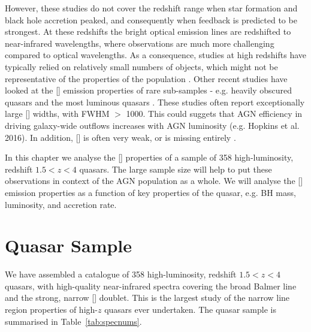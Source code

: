 However, these studies do not cover the redshift range when star formation and black hole accretion peaked, and consequently when feedback is predicted to be strongest. 
At these redshifts the bright optical emission lines are redshifted to near-infrared wavelengths, where observations are much more challenging compared to optical wavelengths. 
As a consequence, studies at high redshifts have typically relied on relatively small numbers of objects, which might not be representative of the properties of the population \citep[e.g.][]{netzer04,sulentic04,shen16a}.
Other recent studies have looked at the [] emission properties of rare sub-samples - e.g. heavily obscured quasars \citep{zakamska16} and the most luminous quasars \citep{bischetti16}. 
These studies often report exceptionally large [] widths, with FWHM $>$ 1000\kms \citep[e.g.][]{netzer04,nesvadba08,kim13,brusa15,carniani15,perna15,bischetti16}. 
This could suggets that AGN efficiency in driving galaxy-wide outflows increases with AGN luminosity (e.g. Hopkins et al. 2016). 
In addition, [] is often very weak, or is missing entirely \citep[e.g.][]{netzer04}. 

In this chapter we analyse the [] properties of a sample of 358 high-luminosity, redshift $1.5 < z < 4$ quasars. 
The large sample size will help to put these observations in context of the AGN population as a whole.
We will analyse the [] emission properties as a function of key properties of the quasar, e.g. BH mass, luminosity, and accretion rate. 

\section{Quasar Sample}

We have assembled a catalogue of 358 high-luminosity, redshift $1.5 < z < 4$ quasars, with high-quality near-infrared spectra covering the broad Balmer \hb line and the strong, narrow [] doublet.
This is the largest study of the narrow line region properties of high-$z$ quasars ever undertaken. 
The quasar sample is summarised in Table~\ref{tab:specnums}.

